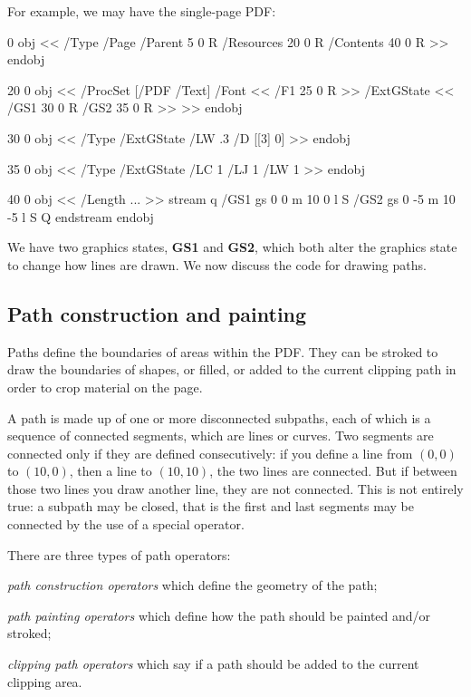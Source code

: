 For example, we may have the single-page PDF:

 0 obj %
<<
    /Type /Page
    /Parent 5 0 R
    /Resources 20 0 R
    /Contents 40 0 R
>>
endobj

20 0 obj %
<<
    /ProcSet [/PDF /Text]
    /Font << /F1 25 0 R >>
    /ExtGState <<
        /GS1 30 0 R
        /GS2 35 0 R
    >>
>>
endobj

30 0 obj %
<<
    /Type /ExtGState
    /LW .3
    /D [[3] 0]
>>
endobj

35 0 obj %
<<
    /Type /ExtGState
    /LC 1
    /LJ 1
    /LW 1
>>
endobj

40 0 obj %
<<
    /Length ...
>>
stream
q
/GS1 gs
0 0 m 10 0 l S
/GS2 gs
0 -5 m 10 -5 l S
Q
endstream
endobj
\elisting

We have two graphics states, {\bf GS1} and {\bf GS2}, which both alter the graphics state to change how lines
are drawn.
We now discuss the code for drawing paths.

\subsection{Path construction and painting}

Paths define the boundaries of areas within the PDF.
They can be stroked to draw the boundaries of shapes, or filled, or added to the current clipping path in order
to crop material on the page.

A path is made up of one or more disconnected subpaths, each of which is a sequence of connected segments,
which are lines or curves.
Two segments are connected only if they are defined consecutively: if you define a line from $(0,0)$ to
$(10,0)$, then a line to $(10,10)$, the two lines are connected.
But if between those two lines you draw another line, they are not connected.
This is not entirely true: a subpath may be closed, that is the first and last segments may be connected by the
use of a special operator.

There are three types of path operators:
\benum
    \item {\it path construction operators} which define the geometry of the path;
    \item {\it path painting operators} which define how the path should be painted and/or stroked;
    \item {\it clipping path operators} which say if a path should be added to the current clipping area.
\eenum


